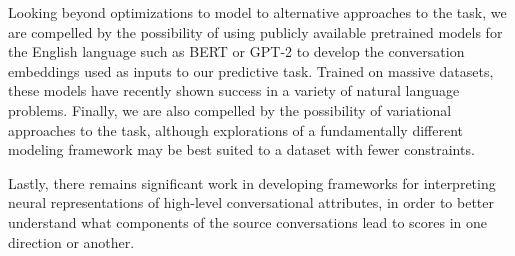 \documentclass{article}
\begin{document}
Looking beyond optimizations to model to alternative approaches to the task, we are compelled by the possibility of using publicly available pretrained models for the English language such as BERT or GPT-2 to develop the conversation embeddings used as inputs to our predictive task. Trained on massive datasets, these models have recently shown success in a variety of natural language problems. Finally, we are also compelled by the possibility of variational approaches to the task, although explorations of a fundamentally different modeling framework may be best suited to a dataset with fewer constraints. 

Lastly, there remains significant work in developing frameworks for interpreting neural representations of high-level conversational attributes, in order to better understand what components of the source conversations lead to scores in one direction or another.








\end{document}

